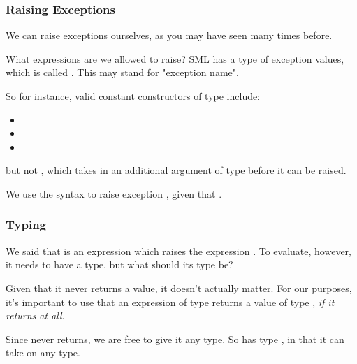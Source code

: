 \documentclass[aspectratio=169]{beamer}
\begin{document}
\begin{frame}[fragile]
  \frametitle{Raising Exceptions}

  We can raise exceptions ourselves, as you may have seen many times before.

  \pause
  \vspace{\fill}

  What expressions are we allowed to raise? SML has a type of exception values,
  which is called . This may stand for "exception name". 

  \pause
  \vspace{\fill}

  So for instance, valid constant constructors of type  include:
  \begin{itemize}
    \item {} 
    \item {}
    \item {}
  \end{itemize}

  \pause
  but not , which takes in an additional argument
  of type  before it can be raised. 

  \pause
  \vspace{\fill}

  We use the syntax  to raise exception , given that
  . 

  \pause
  \vspace{\fill}

\end{frame}

\begin{frame}[fragile]
  \frametitle{Typing }

  We said that  is an expression which raises the expression
  . To evaluate, however, it needs to have a type, but what should
  its type be?

  \pause
  \vspace{\fill}

  Given that it never returns a value, it doesn't actually matter. For our
  purposes, it's important to use that an expression of type  
  returns a value of type , \textit{if it returns at all}.

  \pause
  \vspace{\fill}

  Since  never returns, we are free to give it any type. So
   has type , in that it can take on any type. 
\end{frame}
\end{document}
